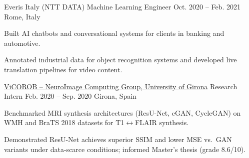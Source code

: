 \begin{cventries}
\cventry
    {Everis Italy (NTT DATA)} %
    {Machine Learning Engineer} %
    {Oct. 2020 -- Feb. 2021} %
    {Rome, Italy} %
    {
      \begin{cvitems}
        \item {Built AI chatbots and conversational systems for clients in banking and automotive.}
        \item {Annotated industrial data for object recognition systems and developed live translation pipelines for video content.}
      \end{cvitems}
    }

\cventry
    {\href{https://vicorob.udg.edu}{ViCOROB -- NeuroImage Computing Group, University of Girona}} %
    {Research Intern} %
    {Feb. 2020 -- Sep. 2020} %
    {Girona, Spain} %
    {
      \begin{cvitems}
        \item {Benchmarked MRI synthesis architectures (ResU-Net, cGAN, CycleGAN) on WMH and BraTS 2018 datasets for T1$\leftrightarrow$FLAIR synthesis.}
        \item {Demonstrated ResU-Net achieves superior SSIM and lower MSE vs.\ GAN variants under data-scarce conditions; informed Master's thesis (grade 8.6/10).}
      \end{cvitems}
    }

\end{cventries}
